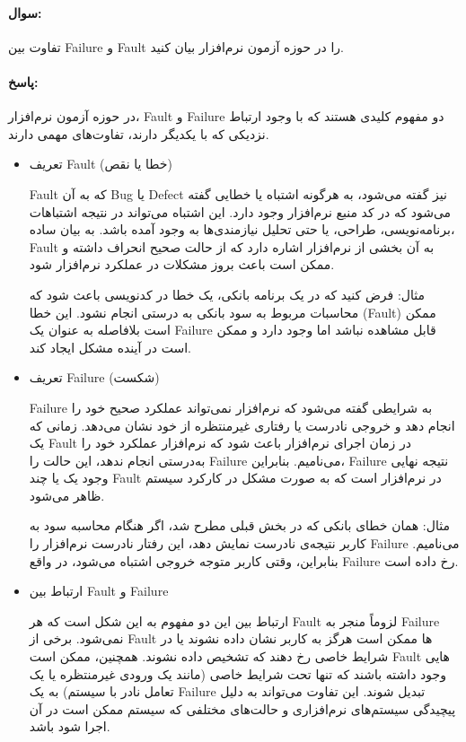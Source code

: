 \documentclass[a4paper,10pt]{article}
\begin{document}
    \paragraph{سوال:} تفاوت بین Failure و Fault را در حوزه آزمون نرم‌افزار بیان کنید.

    \paragraph{پاسخ:} در حوزه آزمون نرم‌افزار، Fault و Failure دو مفهوم کلیدی هستند که با وجود ارتباط نزدیکی که با یکدیگر دارند، تفاوت‌های مهمی دارند.

    \begin{itemize}
        
        \item تعریف Fault (خطا یا نقص)
        
        Fault که به آن Bug یا Defect نیز گفته می‌شود، به هرگونه اشتباه یا خطایی گفته می‌شود که در کد منبع نرم‌افزار وجود دارد. این اشتباه می‌تواند در نتیجه‌ اشتباهات برنامه‌نویسی، طراحی، یا حتی تحلیل نیازمندی‌ها به وجود آمده باشد. به بیان ساده، Fault به آن بخشی از نرم‌افزار اشاره دارد که از حالت صحیح انحراف داشته و ممکن است باعث بروز مشکلات در عملکرد نرم‌افزار شود.

        مثال: فرض کنید که در یک برنامه‌ بانکی، یک خطا در کدنویسی باعث شود که محاسبات مربوط به سود بانکی به درستی انجام نشود. این خطا (Fault) ممکن است بلافاصله به‌ عنوان یک Failure قابل مشاهده نباشد اما وجود دارد و ممکن است در آینده مشکل ایجاد کند.

        \item تعریف Failure (شکست)
        
        Failure به شرایطی گفته می‌شود که نرم‌افزار نمی‌تواند عملکرد صحیح خود را انجام دهد و خروجی نادرست یا رفتاری غیرمنتظره از خود نشان می‌دهد. زمانی که یک Fault در زمان اجرای نرم‌افزار باعث شود که نرم‌افزار عملکرد خود را به‌درستی انجام ندهد، این حالت را Failure می‌نامیم. بنابراین، Failure نتیجه‌ نهایی وجود یک یا چند Fault در نرم‌افزار است که به صورت مشکل در کارکرد سیستم ظاهر می‌شود.

        مثال: همان خطای بانکی که در بخش قبلی مطرح شد، اگر هنگام محاسبه‌ سود به کاربر نتیجه‌ی نادرست نمایش دهد، این رفتار نادرست نرم‌افزار را Failure می‌نامیم. بنابراین، وقتی کاربر متوجه خروجی اشتباه می‌شود، در واقع Failure رخ داده است.

        \item ارتباط بین Fault و Failure

        ارتباط بین این دو مفهوم به این شکل است که هر Fault لزوماً منجر به Failure نمی‌شود. برخی از Fault ها ممکن است هرگز به کاربر نشان داده نشوند یا در شرایط خاصی رخ دهند که تشخیص داده نشوند. همچنین، ممکن است Fault هایی وجود داشته باشند که تنها تحت شرایط خاصی (مانند یک ورودی غیرمنتظره یا یک تعامل نادر با سیستم) به یک Failure تبدیل شوند. این تفاوت می‌تواند به دلیل پیچیدگی سیستم‌های نرم‌افزاری و حالت‌های مختلفی که سیستم ممکن است در آن اجرا شود باشد.


\end{itemize}
\end{document}
